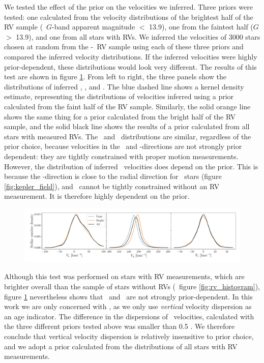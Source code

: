 We tested the effect of the prior on the velocities we inferred.
Three priors were tested: one calculated from the velocity distributions of
the brightest half of the RV sample (\gaia\ $G$-band apparent magnitude $<$
13.9), one from the faintest half ($G$ $>$ 13.9), and one from all stars with
RVs.
We inferred the velocities of 3000 stars chosen at random from the
\gaia-\lamost\ RV sample using each of these three priors and compared the
inferred velocity distributions.
If the inferred velocities were highly prior-dependent, these distributions
would look very different.
The results of this test are shown in figure \ref{fig:prior_comparison}.
From left to right, the three panels show the distributions of inferred \vx,
\vz, and \vy.
The blue dashed line shows a kernel density estimate, representing the
distributions of velocities inferred using a prior calculated from the faint
half of the RV sample.
Similarly, the solid orange line shows the same thing for a prior calculated
from the bright half of the RV sample, and the solid black line shows the
results of a prior calculated from all stars with measured RVs.
The \vx\ and \vz\ distributions are similar, regardless of the prior choice,
because velocities in the \x\ and \z-directions are not strongly prior
dependent: they are tightly constrained with proper motion measurements.
However, the distribution of inferred \vy\ velocities does depend on the
prior.
This is because the \y-direction is close to the radial direction for \kepler\
stars (figure \ref{fig:kepler_field}), and \vy\ cannot be tightly constrained
without an RV measurement.
It is therefore highly dependent on the prior.
\begin{figure}[ht!]
\caption{
    }
  \centering
    \includegraphics[width=1\textwidth]{prior_comparison}
\label{fig:prior_comparison}
\end{figure}


Although this test was performed on stars with RV measurements, which are
brighter overall than the sample of stars without RVs (\eg\ figure
\ref{fig:rv_histogram}), figure \ref{fig:prior_comparison} nevertheless shows
that \vx\ and \vz\ are not strongly prior-dependent.
In this work we are only concerned with \vz, as we only use {\it vertical}
velocity dispersion as an age indicator.
The difference in the dispersions of \vz\ velocities, calculated with the
three different priors tested above was smaller than 0.5 \kms.
We therefore conclude that vertical velocity dispersion is relatively
insensitive to prior choice, and we adopt a prior calculated from the
distributions of all stars with RV measurements.

